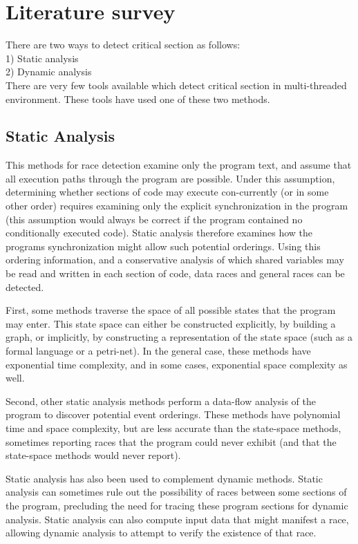 \chapter{Literature survey}

There are two ways to detect critical section as follows:\\
1) Static analysis\\
2) Dynamic analysis\\

There are very few tools available which detect critical section in multi-threaded environment.
These tools have used one of these two methods.

\section{Static Analysis}
This methods for race detection examine only the program text, and assume that all execution paths through the program are possible. Under this assumption, determining whether sections of code may execute con-currently (or in some other order) requires examining only the explicit synchronization in the program (this assumption would always be correct if the program contained no conditionally executed code). Static analysis therefore examines how the programs synchronization might allow such potential orderings. Using this ordering information, and a conservative analysis of which shared variables may be read and written in each section of code, data races and general races can be detected.

First, some methods traverse the space of all possible states that the program may enter. This state space can either be constructed explicitly, by building a graph, or implicitly, by constructing a representation of the state space (such as a formal language or a petri-net). In the general case, these methods have exponential time complexity, and in some cases, exponential space complexity as well.

Second, other static analysis methods perform a data-flow analysis of the program to discover potential event orderings. These methods have polynomial time and space complexity, but are less accurate than the state-space methods, sometimes reporting races that the program could never exhibit (and that the state-space methods would never report).

Static analysis has also been used to complement dynamic methods. Static analysis can sometimes rule out the possibility of races between some sections of the program, precluding the need for tracing these program sections for dynamic analysis. Static analysis can also compute input data that might manifest a race, allowing dynamic analysis to attempt to verify the existence of that race.

